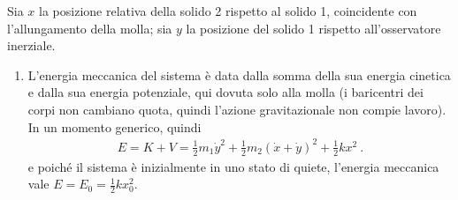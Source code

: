 \documentclass[letterpaper,10pt,italian]{jupyterBook}
\begin{document}
\sphinxAtStartPar
{} Sia \(x\) la posizione relativa della solido 2 rispetto al solido 1, coincidente con l’allungamento della molla; sia \(y\) la posizione del solido 1 rispetto all’osservatore inerziale.
\begin{enumerate}
%
\item {} 
\sphinxAtStartPar
L’energia meccanica del sistema è data dalla somma della sua energia cinetica e dalla sua energia potenziale, qui dovuta solo alla molla (i baricentri dei corpi non cambiano quota, quindi l’azione gravitazionale non compie lavoro). In un momento generico, quindi
\begin{equation*}
\begin{split}E = K + V = \frac{1}{2} m_1 \dot{y}^2 + \frac{1}{2} m_2 \left( \dot{x} + \dot{y} \right)^2 + \frac{1}{2} k x^2 \ .\end{split}
\end{equation*}
\sphinxAtStartPar
e poiché il sistema è inizialmente in uno stato di quiete, l’energia meccanica vale \(E = E_{0} = \frac{1}{2} k x_0^2\).


\end{enumerate}
\end{document}
